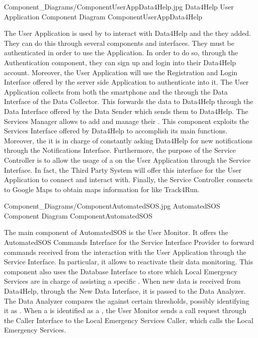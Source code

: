 \documentclass[../../DD.tex]{subfiles}
\begin{document}
	\image {13cm} {Component_Diagrams/ComponentUserAppData4Help.jpg} {Data4Help User Application Component Diagram} {ComponentUserAppData4Help}

	The User Application is used by  to interact with Data4Help and the  they added. They can do this through several components and interfaces. They must be authenticated in order to use the Application. In order to do so, through the Authentication component, they can sign up and login into their Data4Help account. Moreover, the User Application will use the Registration and Login Interface offered by the server side Application to authenticate into it.
	The User Application collects  from both the smartphone and the  through the Data Interface of the Data Collector. This forwards the data to Data4Help through the Data Interface offered by the Data Sender which sends them to Data4Help.
	The Services Manager allows  to add and manage their . This component exploits the Services Interface offered by Data4Help to accomplish its main functions. Moreover, the it is in charge of constantly asking Data4Help for new notifications through the Notifications Interface.
	Furthermore, the purpose of the Service Controller is to allow the usage of a  on the User Application through the Service Interface. In fact, the Third Party System will offer this interface for the User Application to connect and interact with. Finally, the Service Controller connects to Google Maps to obtain maps information for  like Track4Run.

	\image {13cm} {Component_Diagrams/ComponentAutomatedSOS.jpg} {AutomatedSOS Component Diagram} {ComponentAutomatedSOS}

	The main component of AutomatedSOS is the User Monitor. It offers the AutomatedSOS Commands Interface for the Service Interface Provider to forward commands received from the interaction with the User Application through the Service Interface. In particular, it allows  to reactivate their data monitoring. This component also uses the Database Interface to store which Local Emergency Services are in charge of assisting a specific .
	When new data is received from Data4Help, through the New Data Interface, it is passed to the Data Analyzer. The Data Analyzer compares the  against certain thresholds, possibly identifying it as . When a  is identified as a , the User Monitor sends a call request through the Caller Interface to the Local Emergency Services Caller, which calls the Local Emergency Services.
\end{document}
